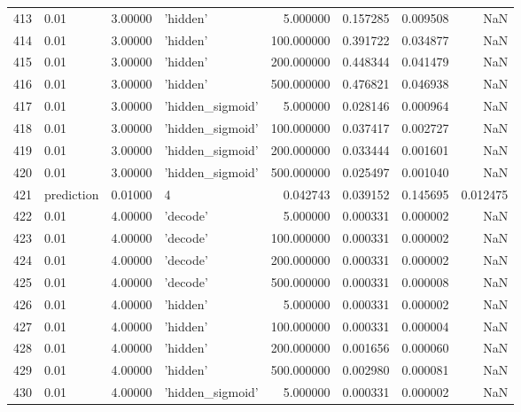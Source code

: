 \documentclass[10pt,a4paper]{article}
\begin{document}
\begin{tabular}{llrlrrrr}
413  &        0.01 &   3.00000 &           'hidden' &    5.000000 &  0.157285 &  0.009508 &       NaN \\
414  &        0.01 &   3.00000 &           'hidden' &  100.000000 &  0.391722 &  0.034877 &       NaN \\
415  &        0.01 &   3.00000 &           'hidden' &  200.000000 &  0.448344 &  0.041479 &       NaN \\
416  &        0.01 &   3.00000 &           'hidden' &  500.000000 &  0.476821 &  0.046938 &       NaN \\
417  &        0.01 &   3.00000 &   'hidden\_sigmoid' &    5.000000 &  0.028146 &  0.000964 &       NaN \\
418  &        0.01 &   3.00000 &   'hidden\_sigmoid' &  100.000000 &  0.037417 &  0.002727 &       NaN \\
419  &        0.01 &   3.00000 &   'hidden\_sigmoid' &  200.000000 &  0.033444 &  0.001601 &       NaN \\
420  &        0.01 &   3.00000 &   'hidden\_sigmoid' &  500.000000 &  0.025497 &  0.001040 &       NaN \\
421  &  prediction &   0.01000 &                  4 &    0.042743 &  0.039152 &  0.145695 &  0.012475 \\
422  &        0.01 &   4.00000 &           'decode' &    5.000000 &  0.000331 &  0.000002 &       NaN \\
423  &        0.01 &   4.00000 &           'decode' &  100.000000 &  0.000331 &  0.000002 &       NaN \\
424  &        0.01 &   4.00000 &           'decode' &  200.000000 &  0.000331 &  0.000002 &       NaN \\
425  &        0.01 &   4.00000 &           'decode' &  500.000000 &  0.000331 &  0.000008 &       NaN \\
426  &        0.01 &   4.00000 &           'hidden' &    5.000000 &  0.000331 &  0.000002 &       NaN \\
427  &        0.01 &   4.00000 &           'hidden' &  100.000000 &  0.000331 &  0.000004 &       NaN \\
428  &        0.01 &   4.00000 &           'hidden' &  200.000000 &  0.001656 &  0.000060 &       NaN \\
429  &        0.01 &   4.00000 &           'hidden' &  500.000000 &  0.002980 &  0.000081 &       NaN \\
430  &        0.01 &   4.00000 &   'hidden\_sigmoid' &    5.000000 &  0.000331 &  0.000002 &       NaN \\

\end{tabular}
\end{document}
